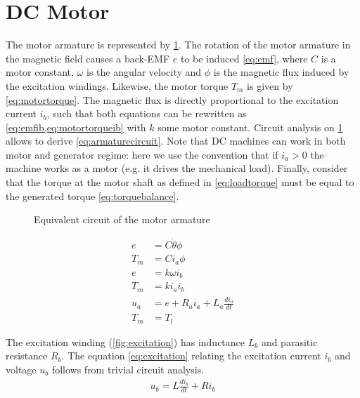 \documentclass{article}
\begin{document}
\section{DC Motor}
The motor armature is represented by \cref{fig:motor}.
The rotation of the motor armature in the magnetic field causes a back-EMF $e$ to be induced \cref{eq:emf}, where $C$ is a motor constant, $\omega$ is the angular velocity and $\phi$ is the magnetic flux induced by the excitation windings.
Likewise, the motor torque $T_m$ is given by \cref{eq:motortorque}.
The magnetic flux is directly proportional to the excitation current $i_b$, such that both equations can be rewritten as \cref{eq:emfib,eq:motortorqueib} with $k$ some motor constant.
Circuit analysis on \cref{fig:motor} allows to derive \cref{eq:armaturecircuit}.
Note that DC machines can work in both motor and generator regime: here we use the convention that if $i_a > 0$ the machine works as a motor (e.g. it drives the mechanical load).
Finally, consider that the torque at the motor shaft as defined in \cref{eq:loadtorque} must be equal to the generated torque \cref{eq:torquebalance}.
\begin{figure}
  \centering
  \caption{Equivalent circuit of the motor armature}
  \label{fig:motor}
\end{figure}

\begin{align}
  e &= C \dot{\theta}\phi \label{eq:emf}\\
  T_m &= C i_a \phi \label{eq:motortorque}\\
  e &= k \omega i_b \label{eq:emfib}\\
  T_m &= k i_ai_b \label{eq:motortorqueib}\\
  u_a &= e + R_a i_a + L_a \frac{di_a}{dt} \label{eq:armaturecircuit}\\
  T_m &= T_l \label{eq:torquebalance}
\end{align}

The excitation winding (\cref{fig:excitation}) has inductance $L_b$ and parasitic resistance $R_b$. The equation \cref{eq:excitation} relating the excitation current $i_b$ and voltage $u_b$ follows from trivial circuit analysis.
\begin{align}
  u_b = L\frac{di_b}{dt} + Ri_b \label{eq:excitation}
\end{align}
\end{document}
